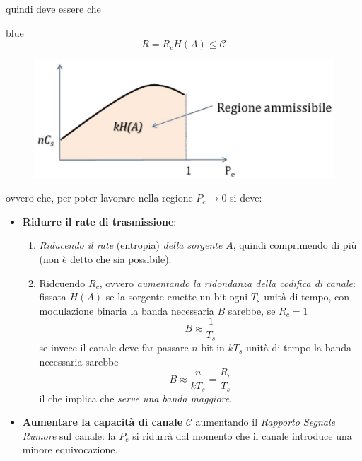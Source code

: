 \begin{minipage}{0.4\textwidth}
quindi deve essere che 
\vspace{15pt}
\begin{mybox}{blue}{}
\vspace{-10pt}
\begin{equation}
    R = R_c H(A) \leq \mathcal{C}
\end{equation}
\end{mybox}
\end{minipage} \hfill
\begin{minipage}{0.4\textwidth}
\begin{figure}[H]
    \centering
    \includegraphics[scale=0.2]{img/ammiss.jpg}
\end{figure}
\end{minipage}

ovvero che, per poter lavorare nella regione $P_e \rightarrow 0$ si deve:
\begin{itemize}
    \item \textbf{Ridurre il rate di trasmissione}:
    \begin{enumerate}
        \item \textit{Riducendo il rate} (entropia) \textit{della sorgente} $A$, quindi comprimendo di pi\`u (non \`e detto che sia possibile).
        \item Ridcuendo $R_c$, ovvero \textit{aumentando la ridondanza della codifica di canale}: fissata $H(A)$ se la sorgente emette un bit ogni $T_s$ unit\`a di tempo, con modulazione binaria la banda necessaria $B$ sarebbe, se $R_c = 1$
        \begin{equation*}
            B \approx \frac{1}{T_s}
        \end{equation*}
        se invece il canale deve far passare $n$ bit in $kT_s$ unit\`a di tempo la banda necessaria sarebbe
        \begin{equation*}
            B \approx \frac{n}{kT_s} = \frac{R_c}{T_s}
        \end{equation*}
        il che implica che \textit{serve una banda maggiore}.
    \end{enumerate}
    \item \textbf{Aumentare la capacità di canale} $\mathcal{C}$ aumentando il \textit{Rapporto Segnale Rumore} sul canale: la $P_e$ si ridurr\`a dal momento che il canale introduce una minore equivocazione.
\end{itemize}
